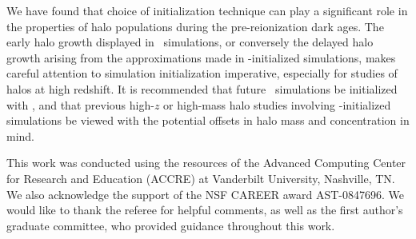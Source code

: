 We have found that choice of initialization technique can play a significant role in the properties of halo populations during the pre-reionization dark ages.  The early halo growth displayed in \lpt\ simulations, or conversely the delayed halo growth arising from the approximations made in \za-initialized simulations, makes careful attention to simulation initialization imperative, especially for studies of halos at high redshift.  It is recommended that future \nbody\ simulations be initialized with \lpt, and that previous high-$z$ or high-mass halo studies involving \za-initialized simulations be viewed with the potential offsets in halo mass and concentration in mind.

This work was conducted using the resources of the Advanced Computing Center for Research and Education (ACCRE) at Vanderbilt University, Nashville, TN.  We also acknowledge the support of the NSF CAREER award AST-0847696.  We would like to thank the referee for helpful comments, as well as the first author's graduate committee, who provided guidance throughout this work.




